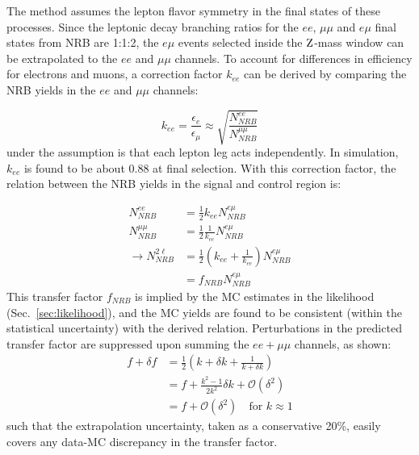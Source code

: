 The method assumes the lepton flavor symmetry in the final states of these processes.
Since the leptonic decay branching ratios for the $ee$, $\mu\mu$ and $e\mu$ final states from NRB are 1:1:2,
the $e\mu$ events selected inside the $\mathrm{Z}$-mass window can be extrapolated to the $ee$ and $\mu\mu$ channels.
To account for differences in efficiency for electrons and muons, a correction factor $k_{ee}$ can be derived
by comparing the NRB yields in the $ee$ and $\mu\mu$ channels:

\begin{equation}
\label{eq:kee}
k_{ee} = \frac{\epsilon_e}{\epsilon_{\mu}} \approx \sqrt{\frac{N^{ee}_{NRB}}{N^{\mu\mu}_{NRB}}}
\end{equation}
under the assumption is that each lepton leg acts independently.
In simulation, $k_{ee}$ is found to be about $0.88$ at final selection.
With this correction factor, the relation between the NRB yields in the signal and control region is:

\begin{equation}
\label{eq:nrb_xfer}
\begin{split}
  N^{ee}_{NRB}     &= \frac{1}{2} k_{ee} N^{e\mu}_{NRB} \\
  N^{\mu\mu}_{NRB} &= \frac{1}{2} \frac{1}{k_{ee}} N^{e\mu}_{NRB} \\
\rightarrow N^{2\ell}_{NRB}  &= \frac{1}{2} \left( k_{ee} + \frac{1}{k_{ee}} \right) N^{e\mu}_{NRB} \\
&= f_{NRB} N^{e\mu}_{NRB}
\end{split}
\end{equation}
This transfer factor $f_{NRB}$ is implied by the MC estimates in the likelihood (Sec.~\ref{sec:likelihood}),
and the MC yields are found to be consistent (within the statistical uncertainty) with the derived relation.
Perturbations in the predicted transfer factor are suppressed upon summing the $ee+\mu\mu$ channels, as shown:
\begin{equation}
\begin{split}
  f + \delta f &= \frac{1}{2} \left( k + \delta k + \frac{1}{k + \delta k} \right) \\
  &= f + \frac{k^2-1}{2k^2} \delta k + \mathcal{O}(\delta^2) \\
  &= f + \mathcal{O}(\delta^2) \quad \text{for } k \approx 1
\end{split}
\end{equation}
such that the extrapolation uncertainty, taken as a conservative 20\%, easily covers any data-MC discrepancy
in the transfer factor.

